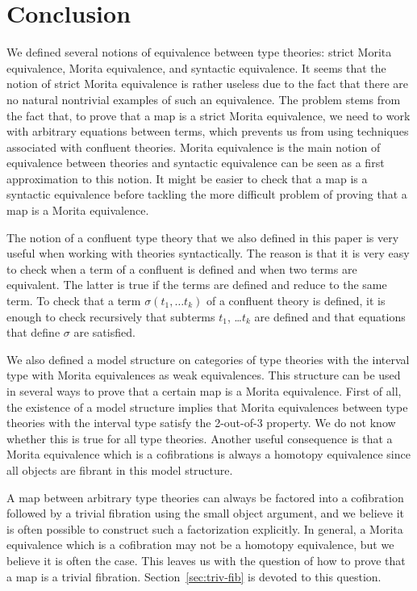 \documentclass[reqno]{amsart}
\theoremstyle{definition}
\theoremstyle{remark}
\numberwithin{figure}{section}
\begin{document}
\section{Conclusion}

We defined several notions of equivalence between type theories: strict Morita equivalence, Morita equivalence, and syntactic equivalence.
It seems that the notion of strict Morita equivalence is rather useless due to the fact that there are no natural nontrivial examples of such an equivalence.
The problem stems from the fact that, to prove that a map is a strict Morita equivalence, we need to work with arbitrary equations between terms, which prevents us from using techniques associated with confluent theories.
Morita equivalence is the main notion of equivalence between theories and syntactic equivalence can be seen as a first approximation to this notion.
It might be easier to check that a map is a syntactic equivalence before tackling the more difficult problem of proving that a map is a Morita equivalence.

The notion of a confluent type theory that we also defined in this paper is very useful when working with theories syntactically.
The reason is that it is very easy to check when a term of a confluent is defined and when two terms are equivalent.
The latter is true if the terms are defined and reduce to the same term.
To check that a term $\sigma(t_1, \ldots t_k)$ of a confluent theory is defined, it is enough to check recursively that subterms $t_1$, \ldots $t_k$ are defined and that equations that define $\sigma$ are satisfied.

We also defined a model structure on categories of type theories with the interval type with Morita equivalences as weak equivalences.
This structure can be used in several ways to prove that a certain map is a Morita equivalence.
First of all, the existence of a model structure implies that Morita equivalences between type theories with the interval type satisfy the 2-out-of-3 property.
We do not know whether this is true for all type theories.
Another useful consequence is that a Morita equivalence which is a cofibrations is always a homotopy equivalence since all objects are fibrant in this model structure.

A map between arbitrary type theories can always be factored into a cofibration followed by a trivial fibration using the small object argument,
and we believe it is often possible to construct such a factorization explicitly.
In general, a Morita equivalence which is a cofibration may not be a homotopy equivalence, but we believe it is often the case.
This leaves us with the question of how to prove that a map is a trivial fibration.
Section~\ref{sec:triv-fib} is devoted to this question.
\end{document}
